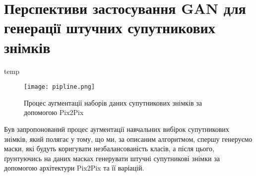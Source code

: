 \section{Перспективи застосування GAN для генерації штучних супутникових знімків}

temp

\begin{figure}[!ht]
    \centering
    \texttt{[image: pipline.png]}
    \caption{Процес аугментації наборів даних супутникових знімків за допомогою Pix2Pix}
    \label{fig:pipline}
\end{figure}



\chapconclude{\ref{chap:gans}}

Був запропонований процес аугментації навчальних вибірок супутникових
знімків, який полягає у тому, що ми, за описаним алгоритмом, спершу
генеруємо маски, які будуть коригувати незбалансованість класів,
а після цього, ґрунтуючись на даних масках генерувати штучні
супутникові знімки за допомогою
архітектури Pix2Pix та її варіацій.